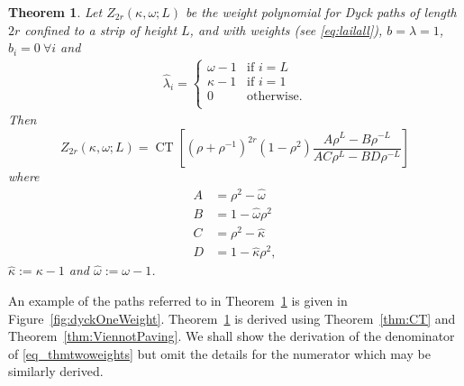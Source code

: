 \documentclass[11pt,a4paper]{article}
\DeclareMathOperator{\CT}{CT}
\newtheorem{theorem}{Theorem}
\newcommand{\ka}{\kappa}
\newcommand{\w}{\omega}
\newcommand{\p}{\rho}
\newcommand{\df}{:=}
\begin{document}
\begin{theorem} \label{thm:DMCT}  
	Let $Z_{2r}(\ka, \w;L)$ be the weight polynomial for Dyck paths of length $2r$ confined to a strip of height $L$, and with weights (see \eqref{eq:lailall}),  $b=\lambda=1$, $\hat b_i=0\ \forall i$ and
\begin{align}
	\hat\lambda_i=\begin{cases}
		\omega-1 & \text{if $i=L$}\\
		\kappa-1 & \text{if $i=1$}\\
		0 & \text{otherwise.}\\
	\end{cases}
\label{eq_dirub}
\end{align}		
%
Then 
\begin{equation}
Z_{2r}(\kappa,\omega;L) =\CT \left [ (\p+\p^{-1})^{2r} (1-\p^2) \frac{A\p^L-B\p^{-L}}{AC\p^L -BD \p^{-L}}\right ]
\label{eq_thmtwoweights}
\end{equation}
where
\begin{subequations} \label{eq:ABCD}
\begin{align}
A &=  \p^2 - \hat{\omega} \\
B &=  1 -\hat{\omega} \p^2 \\
C &=  \p^2 - \hat{\kappa} \\
D &=  1 -\hat{\kappa} \p^2, 
\end{align}	
\end{subequations}
$\hat{\ka} \df  \ka -1$ and $\hat{\w} \df  \w - 1$.
\end{theorem}
%
An example of the paths referred to in Theorem~\ref{thm:DMCT} is given in Figure~\ref{fig:dyckOneWeight}. 
Theorem~\ref{thm:DMCT} is derived using Theorem~\ref{thm:CT} and Theorem~\ref{thm:ViennotPaving}.   We shall show the derivation of  the denominator of \eqref{eq_thmtwoweights} but omit the details for  the numerator which may be similarly derived.  
\end{document}
